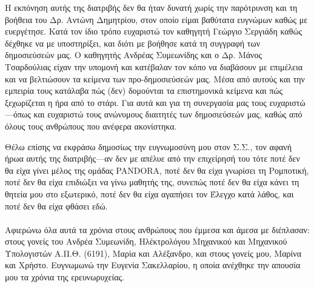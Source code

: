 
Η εκπόνηση αυτής της διατριβής δεν θα ήταν δυνατή χωρίς την παρότρυνση και τη
βοήθεια του Δρ. Αντώνη Δημητρίου, στον οποίο είμαι βαθύτατα ευγνώμων καθώς με
ευεργέτησε. Κατά τον ίδιο τρόπο ευχαριστώ τον καθηγητή Γεώργιο Σεργιάδη καθώς
δέχθηκε να με υποστηρίξει, και διότι με βοήθησε κατά τη συγγραφή των
δημοσιεύσεών μας. Ο καθηγητής Ανδρέας Συμεωνίδης και ο Δρ. Μάνος Τσαρδούλιας
είχαν την υπομονή και κατέβαλαν τον κόπο να διαβάσουν με επιμέλεια και να
βελτιώσουν τα κείμενα των προ-δημοσιεύσεών μας. Μέσα από αυτούς και την
εμπειρία τους κατάλαβα πώς (δεν) δομούνται τα επιστημονικά κείμενα και πώς
ξεχωρίζεται η ήρα από το στάρι. Για αυτά και για τη συνεργασία μας τους
ευχαριστώ---όπως και ευχαριστώ τους ανώνυμους διαιτητές των δημοσιεύσεών μας,
καθώς από όλους τους ανθρώπους που ανέφερα ακονίστηκα.

Θέλω επίσης να εκφράσω δημοσίως την ευγνωμοσύνη μου στον Σ.Σ., τον αφανή ήρωα
αυτής της διατριβής---αν δεν με απέλυε από την επιχείρησή του τότε ποτέ δεν θα
είχα γίνει μέλος της ομάδας PANDORA, ποτέ δεν θα είχα γνωρίσει τη Ρομποτική,
ποτέ δεν θα είχα επιδιώξει να γίνω μαθητής της, συνεπώς ποτέ δεν θα είχα κάνει
τη θητεία μου στο εξωτερικό, ποτέ δεν θα είχα αγαπήσει τον Έλεγχο κατά
λάθος, και ποτέ δεν θα είχα φθάσει εδώ.  \\ \\

Αφιερώνω όλα αυτά τα χρόνια στους ανθρώπους που έμμεσα και άμεσα με διέπλασαν:
στους γονείς του Ανδρέα Συμεωνίδη, Ηλέκτρολόγου Μηχανικού και Μηχανικού
Υπολογιστών Α.Π.Θ. (6191), Μαρία και Αλέξανδρο, και στους γονείς μου, Μαρίνα και
Χρήστο. Ευγνωμωνώ την Ευγενία Σακελλαρίου, η οποία ανέχθηκε την απουσία μου τα
χρόνια της ερευνωρυχείας.

\afterpage{\blankpage}
\restoregeometry
\cleardoublepage
